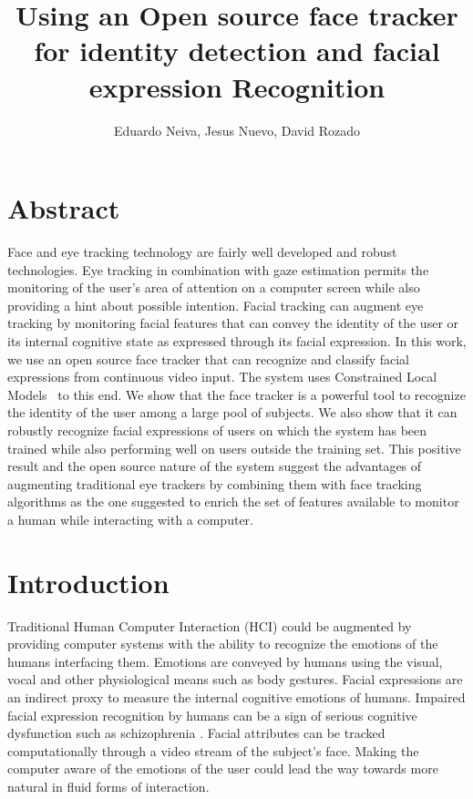 \documentclass[]{article}
\title{Using an Open source face tracker for identity detection and facial expression Recognition}
\author{Eduardo Neiva, Jesus Nuevo, David Rozado}
\begin{document}
\maketitle

\section{Abstract}
Face and eye tracking technology are fairly well developed and robust technologies. Eye tracking in combination with
gaze estimation permits the monitoring of the user's area of attention on a computer screen while also providing a hint
about possible intention. Facial tracking can augment eye tracking by monitoring facial features that can convey the
identity of the user or its internal cognitive state as expressed through its facial expression. In this work, we use an
open source face tracker that can recognize and classify facial expressions from continuous video input. The system uses
Constrained Local Models~\cite{saragih2011deformable} to this end. We
show that the face tracker is a powerful tool to recognize the
identity
of the user among a large pool of subjects. We also show that it can robustly recognize facial expressions of users on
which the system has been trained while also performing well on users
outside the training set. This positive
result and the open source nature of the system suggest the advantages of augmenting traditional eye trackers by
combining them with face tracking algorithms as the one suggested to enrich the set of features available to monitor a
human while interacting with a computer.


\section{Introduction}
Traditional Human Computer Interaction (HCI) could be augmented by providing computer systems with the ability to
recognize the emotions of the humans interfacing them. Emotions are conveyed by humans  using the visual, vocal
and other physiological means such as body gestures. Facial expressions are an indirect proxy to measure the internal
cognitive emotions of humans. Impaired facial expression recognition by humans can be a sign of serious cognitive
dysfunction such as schizophrenia \cite{Edwards2002789}.  Facial attributes can be tracked computationally through a
video stream of the subject's face. Making the computer aware of the emotions of the user could lead the way towards
more natural in fluid forms of interaction.
\end{document}

